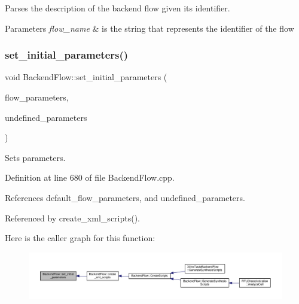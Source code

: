 Parses the description of the backend flow given its identifier. 


\begin{DoxyParams}{Parameters}
{\em flow\+\_\+name} & is the string that represents the identifier of the flow \\
\hline
\end{DoxyParams}
\mbox{\label{classBackendFlow_abe677fcf55f872255367bf89e8923deb}} 
\subsubsection{\texorpdfstring{set\+\_\+initial\+\_\+parameters()}{set\_initial\_parameters()}}
{\footnotesize\ttfamily void Backend\+Flow\+::set\+\_\+initial\+\_\+parameters (\begin{DoxyParamCaption}\item[{const \hyperlink{DesignParameters_8hpp_ae36bb1c4c9150d0eeecfe1f96f42d157}{Design\+Parameters\+Ref} \&}]{flow\+\_\+parameters,  }\item[{const \hyperlink{classCustomOrderedSet}{Custom\+Ordered\+Set}$<$ std\+::string $>$ \&}]{undefined\+\_\+parameters }\end{DoxyParamCaption})}



Sets parameters. 



Definition at line 680 of file Backend\+Flow.\+cpp.



References default\+\_\+flow\+\_\+parameters, and undefined\+\_\+parameters.



Referenced by create\+\_\+xml\+\_\+scripts().

Here is the caller graph for this function\+:
\nopagebreak
\begin{figure}[H]
\begin{center}
\leavevmode
\includegraphics[width=350pt]{da/d75/classBackendFlow_abe677fcf55f872255367bf89e8923deb_icgraph}
\end{center}
\end{figure}
\mbox{\label{classBackendFlow_a52ba6d2baaf1d67d2c5461c41a307822}} 
